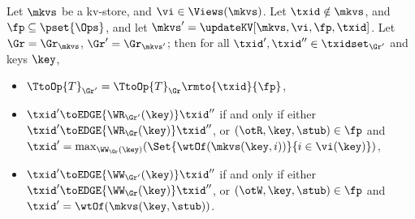 \begin{lemma}
\label{lem:graph.update}
Let $\mkvs$ be a kv-store, and $\vi \in \Views(\mkvs)$. Let $\txid \notin \mkvs$, and 
$\fp \subseteq \pset{\Ops}$, and let $\mkvs' = \updateKV[\mkvs, \vi, \fp, \txid]$. 
Let $\Gr = \Gr_{\mkvs}$, $\Gr' = \Gr_{\mkvs'}$; then for all $\txid', \txid'' \in \txidset_{\Gr'}$ and keys $\key$, 
\begin{itemize}
\item $\TtoOp{T}_{\Gr'} = \TtoOp{T}_{\Gr}\rmto{\txid}{\fp}$, 
\item $\txid' \toEDGE{\WR_{\Gr'}(\key)} \txid''$ if and only if either 
$\txid' \toEDGE{\WR_{\Gr}(\key)} \txid''$, or $(\otR, \key, \stub) \in \fp$ and 
$\txid' = \max_{\WW_{\Gr}(\key)}(\Set{\wtOf(\mkvs(\key, i)) }{ i \in \vi(\key)})$, 
\item $\txid' \toEDGE{\WW_{\Gr'}(\key)} \txid''$ if and only if either 
$\txid' \toEDGE{\WW_{\Gr}(\key)} \txid''$, or $(\otW, \key, \stub) \in \fp$ 
and $\txid' = \wtOf(\mkvs(\key, \stub))$. 
\end{itemize}
\end{lemma}

